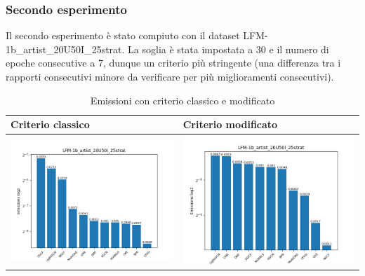 \subsubsection{Secondo esperimento}
Il secondo esperimento è stato compiuto con il dataset LFM-1b\_artist\_20U50I\_25strat. La soglia è stata impostata a 30 e il numero di epoche consecutive a 7, dunque un criterio più stringente (una differenza tra i rapporti consecutivi minore da verificare per più miglioramenti consecutivi).


\begin{table}[H]
    \centering
    \footnotesize
    \setlength\tabcolsep{0pt}
    \begin{tabularx}{\textwidth}{|X|X|}
        \hline
        \textbf{Criterio classico} & \textbf{Criterio modificato} \\
        \hline
        \includegraphics[width=\linewidth, trim=0 0 0 0]{images/emissions_LFM-1b_artist_20U50I_25strat_earlyClassic.png} &
        \includegraphics[width=\linewidth, trim=0 0 0 0]{images/emissions_LFM-1b_artist_20U50I_25strat_earlyModified.png} \\
        \hline
    \end{tabularx}
    \caption{Emissioni con criterio classico e modificato}
    \label{tab:emissions_info}
\end{table}



